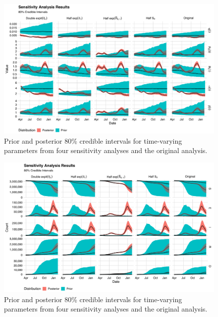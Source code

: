 \begin{figure}[htbp]
    \centering
    \includegraphics[width=1.0\columnwidth]{time_varying_sensitivity_plot}
    \caption{
    Prior and posterior 80\% credible intervals for time-varying parameters from four sensitivity analyses and the original analysis.}
    \label{ch_4:fig:time_varying_sensitivity_plot}
\end{figure}

\begin{figure}[htbp]
    \centering
    \includegraphics[width=1.0\columnwidth]{compartments_sensitivity_plot}
    \caption{Prior and posterior 80\% credible intervals for time-varying parameters from four sensitivity analyses and the original analysis.}
    \label{ch_4:fig:compartments_sensitivity_plot}
\end{figure}

